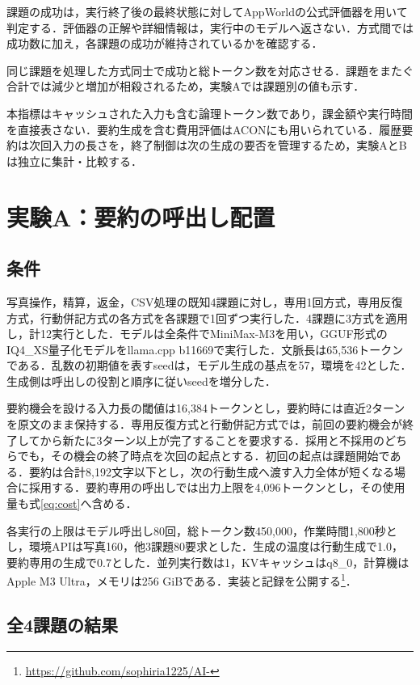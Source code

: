 \documentclass[letter]{ieicej}
\begin{document}
課題の成功は，実行終了後の最終状態に対してAppWorld\cite{trivedi2024appworld}の公式評価器を用いて判定する．評価器の正解や詳細情報は，実行中のモデルへ返さない．方式間では成功数に加え，各課題の成功が維持されているかを確認する．

同じ課題を処理した方式同士で成功と総トークン数を対応させる．課題をまたぐ合計では減少と増加が相殺されるため，実験Aでは課題別の値も示す．

本指標はキャッシュされた入力も含む論理トークン数であり，課金額や実行時間を直接表さない\cite{xu2026tokenpilot}．要約生成を含む費用評価はACON\cite{kang2026acon}にも用いられている．履歴要約は次回入力の長さを，終了制御は次の生成の要否を管理するため，実験AとBは独立に集計・比較する．

\section{実験A：要約の呼出し配置}

\subsection{条件}

写真操作，精算，返金，CSV処理の既知4課題に対し，専用1回方式，専用反復方式，行動併記方式の各方式を各課題で1回ずつ実行した．4課題に3方式を適用し，計12実行とした．モデルは全条件でMiniMax-M3を用い，GGUF形式のIQ4\_XS量子化モデルをllama.cpp b11669で実行した．文脈長は65,536トークンである．乱数の初期値を表すseedは，モデル生成の基点を57，環境を42とした．生成側は呼出しの役割と順序に従いseedを増分した．

要約機会を設ける入力長の閾値は16,384トークンとし，要約時には直近2ターンを原文のまま保持する．専用反復方式と行動併記方式では，前回の要約機会が終了してから新たに3ターン以上が完了することを要求する．採用と不採用のどちらでも，その機会の終了時点を次回の起点とする．初回の起点は課題開始である．要約は合計8,192文字以下とし，次の行動生成へ渡す入力全体が短くなる場合に採用する．要約専用の呼出しでは出力上限を4,096トークンとし，その使用量も式\eqref{eq:cost}へ含める．

各実行の上限はモデル呼出し80回，総トークン数450,000，作業時間1,800秒とし，環境APIは写真160，他3課題80要求とした．生成の温度は行動生成で1.0，要約専用の生成で0.7とした．並列実行数は1，KVキャッシュはq8\_0，計算機はApple M3 Ultra，メモリは256 GiBである．実装と記録を公開する\footnote{\url{https://github.com/sophiria1225/AI-}}．

\subsection{全4課題の結果}
\end{document}
